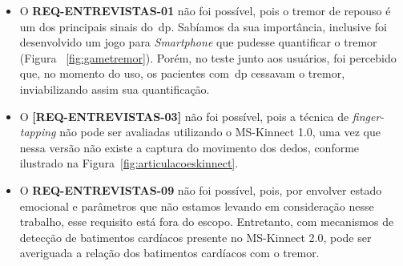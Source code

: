 \begin{itemize}
	\item O \textbf{REQ-ENTREVISTAS-01} não foi possível, pois o tremor de repouso é um dos principais sinais do~\ac{dp}. Sabíamos da sua importância, inclusive foi desenvolvido um jogo para \textit{Smartphone} que pudesse quantificar o tremor (Figura ~\ref{fig:gametremor}). Porém, no teste junto aos usuários, foi percebido que, no momento do uso, os pacientes com~\ac{dp} cessavam o tremor, inviabilizando assim sua quantificação. 
	\item O \textbf{[REQ-ENTREVISTAS-03]} não foi possível, pois a técnica de \textit{finger-tapping} não pode ser avaliadas utilizando o MS-Kinnect 1.0, uma vez que nessa versão não existe a captura do movimento dos dedos, conforme ilustrado na Figura~\ref{fig:articulacoeskinnect}.
	\item O \textbf{REQ-ENTREVISTAS-09} não foi possível, pois, por envolver estado emocional e parâmetros que não estamos levando em consideração nesse trabalho, esse requisito está fora do escopo. Entretanto, com mecanismos de detecção de batimentos cardíacos presente no MS-Kinnect 2.0, pode ser averiguada a relação dos batimentos cardíacos com o tremor.
\end{itemize}







